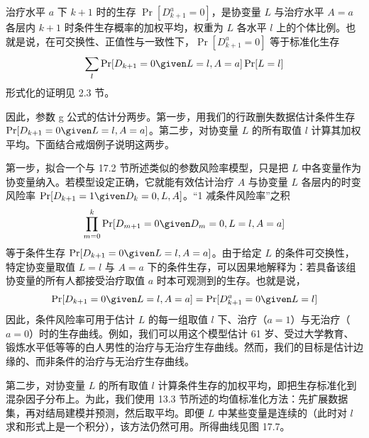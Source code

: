 治疗水平 $a$ 下 $k+1$ 时的生存 $\Pr[D_{k+1}^a=0]$，是协变量 $L$ 与治疗水平 $A=a$ 各层内 $k+1$ 时条件生存概率的加权平均，权重为 $L$ 各水平 $l$ 上的个体比例。也就是说，在可交换性、正值性与一致性下，$\Pr[D_{k+1}^a=0]$ 等于标准化生存
\[
\sum_l\Pr[D_{k+1}=0\given L=l,A=a]\Pr[L=l]
\]
形式化的证明见 2.3 节。

因此，参数 g 公式的估计分两步。第一步，用我们的行政删失数据估计条件生存 $\Pr[D_{k+1}=0\given L=l,A=a]$。第二步，对协变量 $L$ 的所有取值 $l$ 计算其加权平均。下面结合戒烟例子说明这两步。

第一步，拟合一个与 17.2 节所述类似的参数风险率模型，只是把 $L$ 中各变量作为协变量纳入。若模型设定正确，它就能有效估计治疗 $A$ 与协变量 $L$ 各层内的时变风险率 $\Pr[D_{k+1}=1\given D_k=0,L,A]$。“1 减条件风险率”之积
\[
\prod_{m=0}^{k}\Pr[D_{m+1}=0\given D_m=0,L=l,A=a]
\]
等于条件生存 $\Pr[D_{k+1}=0\given L=l,A=a]$。由于给定 $L$ 的条件可交换性，特定协变量取值 $L=l$ 与 $A=a$ 下的条件生存，可以因果地解释为：若具备该组协变量的所有人都接受治疗取值 $a$ 时本可观测到的生存。也就是说，
\[
\Pr[D_{k+1}=0\given L=l,A=a]=\Pr[D_{k+1}^a=0\given L=l]
\]
因此，条件风险率可用于估计 $L$ 的每一组取值 $l$ 下、治疗（$a=1$）与无治疗（$a=0$）时的生存曲线。例如，我们可以用这个模型估计 61 岁、受过大学教育、锻炼水平低等等的白人男性的治疗与无治疗生存曲线。然而，我们的目标是估计边缘的、而非条件的治疗与无治疗生存曲线。

第二步，对协变量 $L$ 的所有取值 $l$ 计算条件生存的加权平均，即把生存标准化到混杂因子分布上。为此，我们使用 13.3 节所述的均值标准化方法：先扩展数据集，再对结局建模并预测，然后取平均。即便 $L$ 中某些变量是连续的（此时对 $l$ 求和形式上是一个积分），该方法仍然可用。所得曲线见图 17.7。

\begin{figure}[htbp]
\centering
{}
\caption{}
\label{fig:17.7}
\end{figure}

